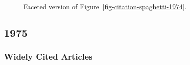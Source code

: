 \documentclass[
  10pt,
  letterpaper,
  DIV=11,
  numbers=noendperiod,
  twoside]{scrartcl}
\begin{document}
\begin{figure}


\caption{\label{fig-citation-facet-1974}Faceted version of
Figure~\ref{fig-citation-spaghetti-1974}.}

\end{figure}%

\newpage

\subsection{1975}\label{sec-s1975}

\subsubsection*{Widely Cited Articles}\label{widely-cited-articles-19}
\end{document}
